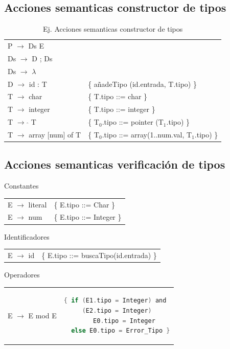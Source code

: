 \documentclass[12pt, twoside, openright]{report} %
\begin{document}
\subsection{Acciones semanticas constructor de tipos}
\begin{table}[H]
\begin{tabular}{ll}
P $\rightarrow$ Ds E \\
Ds $\rightarrow$ D ; Ds \\
Ds $\rightarrow$ $\lambda$ \\
D $\rightarrow$ id : T & \{ añadeTipo (id.entrada, T.tipo) \} \\
T $\rightarrow$ char & \{ T.tipo ::= char \} \\
T $\rightarrow$ integer & \{ T.tipo ::= integer \} \\
T $\rightarrow$  $\hat{}$ T & \{ T$_0$.tipo ::= pointer (T$_1$.tipo) \} \\
T $\rightarrow$ array [num] of T & \{ T$_0$.tipo ::= array(1..num.val, T$_1$.tipo) \} \\
\end{tabular}
\caption{Ej. Acciones semanticas constructor de tipos}
\end{table}

\subsection{Acciones semanticas verificación de tipos}
Constantes
\begin{table}[H]
\begin{tabular}{ll}
E $\rightarrow$ literal & \{ E.tipo ::= Char \} \\
E $\rightarrow$ num & \{ E.tipo ::= Integer \} \\
\end{tabular}
\end{table}

Identificadores
\begin{table}[H]
\begin{tabular}{ll}
E $\rightarrow$ id& \{ E.tipo ::= buscaTipo(id.entrada) \} \\
\end{tabular}
\end{table}

Operadores
\begin{table}[H]
\begin{tabular}{ll}
E $\rightarrow$ E mod E & 
\textbf{ } \begin{lstlisting}[language=C]
{ if (E1.tipo = Integer) and
     (E2.tipo = Integer)
        E0.tipo = Integer
  else E0.tipo = Error_Tipo }
\end{lstlisting} \\
\end{tabular}
\end{table}
\end{document}
